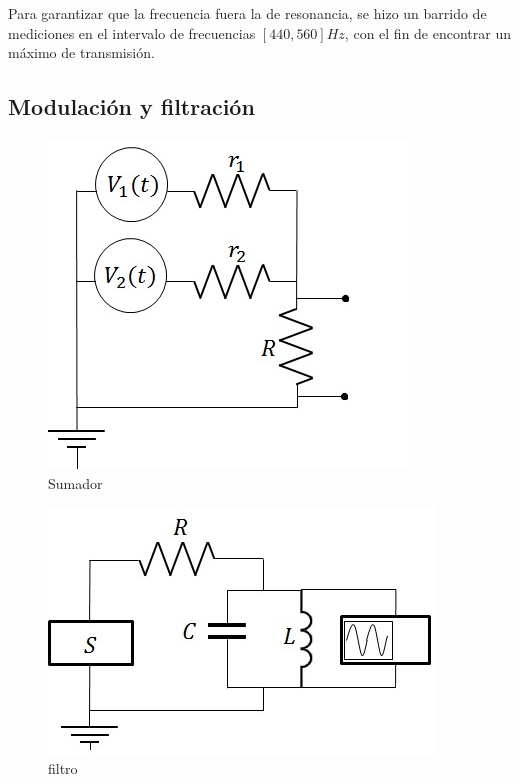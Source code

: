 \documentclass[11pt,a4paper]{article}
\begin{document}
Para garantizar que la frecuencia fuera la de resonancia, se hizo un barrido de mediciones en el intervalo de frecuencias  $[440,560] Hz$, con el fin de encontrar un máximo de transmisión.


\subsection{Modulación y filtración}



\begin{figure}[h]
\centering
\includegraphics[scale=0.7]{Sumador}
\caption{Sumador}
\label{fig:Sumador}
\end{figure}

\begin{figure}[h]
\centering
\includegraphics[scale=0.8]{filtro}
\caption{filtro}
\label{fig:filtro}
\end{figure}

\end{document}
